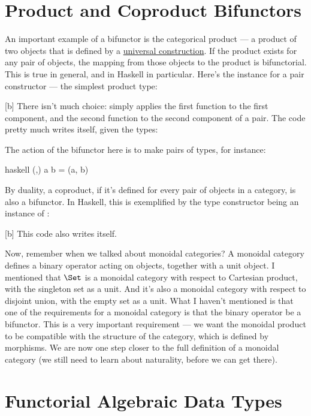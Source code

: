 \section{Product and Coproduct Bifunctors}

An important example of a bifunctor is the categorical product --- a
product of two objects that is defined by a \hyperref[products-and-coproducts]{universal
  construction}. If the product exists for any pair of objects, the
mapping from those objects to the product is bifunctorial. This is true
in general, and in Haskell in particular. Here's the 
instance for a pair constructor --- the simplest product type:

[b]
There isn't much choice:  simply applies the first
function to the first component, and the second function to the second
component of a pair. The code pretty much writes itself, given the
types:

The action of the bifunctor here is to make pairs of types, for
instance:

\begin{snip}{haskell}
(,) a b = (a, b)
\end{snip}
By duality, a coproduct, if it's defined for every pair of objects in a
category, is also a bifunctor. In Haskell, this is exemplified by the
 type constructor being an instance of
:

[b]
This code also writes itself.

Now, remember when we talked about monoidal categories? A monoidal
category defines a binary operator acting on objects, together with a
unit object. I mentioned that $\Set$ is a monoidal category with
respect to Cartesian product, with the singleton set as a unit. And it's
also a monoidal category with respect to disjoint union, with the empty
set as a unit. What I haven't mentioned is that one of the requirements
for a monoidal category is that the binary operator be a bifunctor. This
is a very important requirement --- we want the monoidal product to be
compatible with the structure of the category, which is defined by
morphisms. We are now one step closer to the full definition of a
monoidal category (we still need to learn about naturality, before we
can get there).

\section{Functorial Algebraic Data Types}

